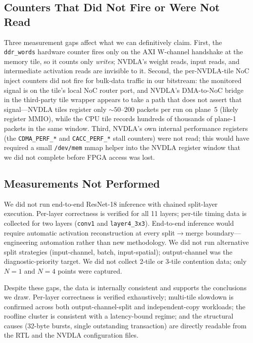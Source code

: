 \documentclass[10pt,sigconf,nonacm]{acmart}
\begin{document}
\subsection{Counters That Did Not Fire or Were Not Read}
Three measurement gaps affect what we can definitively claim.
First, the \texttt{ddr\_words} hardware counter fires only on the
AXI W-channel handshake at the memory tile, so it counts only
\emph{writes}; NVDLA's weight reads, input reads, and intermediate
activation reads are invisible to it. Second, the
per-NVDLA-tile NoC inject counters did not fire for bulk-data
traffic in our bitstream: the monitored signal is on the tile's
local NoC router port, and NVDLA's DMA-to-NoC bridge in the
third-party tile wrapper appears to take a path that does not
assert that signal---NVDLA tiles register only $\sim 50\textrm{--}200$
packets per run on plane~5 (likely register MMIO), while the CPU
tile records hundreds of thousands of plane-1 packets in the same
window. Third, NVDLA's own internal performance registers
(the \texttt{CDMA\_PERF\_*} and \texttt{CACC\_PERF\_*} stall
counters) were not read; this would have required a small
\texttt{/dev/mem} mmap helper into the NVDLA register window
that we did not complete before FPGA access was lost.

\subsection{Measurements Not Performed}
We did not run end-to-end ResNet-18 inference with chained
split-layer execution. Per-layer correctness is verified for all
11 layers; per-tile timing data is collected for two layers
(\texttt{conv1} and \texttt{layer4\_3x3}). End-to-end inference
would require automatic activation reconstruction at every
split$\to$merge boundary---engineering automation rather than new
methodology. We did not run alternative split strategies
(input-channel, batch, input-spatial); output-channel was the
diagnostic-priority target. We did not collect 2-tile or 3-tile
contention data; only $N=1$ and $N=4$ points were captured.

Despite these gaps, the data is internally consistent and supports
the conclusions we draw. Per-layer correctness is verified
exhaustively; multi-tile slowdown is confirmed across both
output-channel-split and independent-copy workloads; the roofline
cluster is consistent with a latency-bound regime; and the
structural causes (32-byte bursts, single outstanding transaction)
are directly readable from the RTL and the NVDLA configuration
files.
\end{document}
